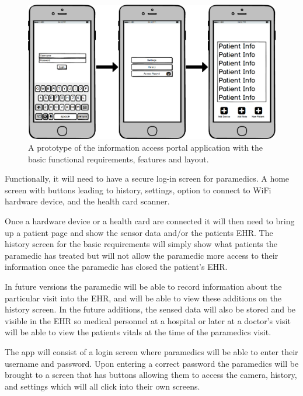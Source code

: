 \begin{figure}[h]
  \centering
  \includegraphics[width=\linewidth]{wireframe.png}
  \captionsetup{format=hang}
  \caption[Preliminary App Prototype]{A prototype of the information access portal application with the basic functional requirements, features and layout.}
  \label{fig:app1}
\end{figure}


Functionally, it will need to have a secure log-in screen for paramedics. A home screen with buttons leading to history, settings, option to connect to WiFi hardware device, and the health card scanner.

Once a hardware device or a health card are connected it will then need to bring up a patient page and show the sensor data and/or the patients EHR. The history screen for the basic requirements will simply show what patients the paramedic has treated but will not allow the paramedic more access to their information once the paramedic has closed the patient's EHR.

In future versions the paramedic will be able to record information about the particular visit into the EHR, and will be able to view these additions on the history screen. In the future additions, the sensed data will also be stored and be visible in the EHR so medical personnel at a hospital or later at a doctor's visit will be able to view the patients vitals at the time of the paramedics visit.







The app will consist of a login screen where paramedics will be able to enter their username and password. Upon entering a correct password the paramedics will be brought to a screen that has buttons allowing them to access the camera, history, and settings which will all click into their own screens. 

